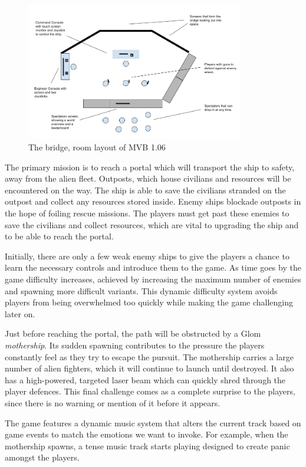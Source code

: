 \documentclass[a4paper,11pt]{article}
\begin{document}
\begin{figure}[ht]
	\centering
    \includegraphics[width=0.85\textwidth]{Room}
    \caption{The bridge, room layout of MVB 1.06}
    \label{fig:room_layout}
\end{figure}

The primary mission is to reach a portal which will transport the ship to safety, away from the alien fleet. Outposts, which house civilians and resources will be encountered on the way. The ship is able to save the civilians stranded on the outpost and collect any resources stored inside. Enemy ships blockade outposts in the hope of foiling rescue missions. The players must get past these enemies to save the civilians and collect resources, which are vital to upgrading the ship and to be able to reach the portal.

Initially, there are only a few weak enemy ships to give the players a chance to learn the necessary controls and introduce them to the game. As time goes by the game difficulty increases, achieved by increasing the maximum number of enemies and spawning more difficult variants. This dynamic difficulty system avoids players from being overwhelmed too quickly while making the game challenging later on.

Just before reaching the portal, the path will be obstructed by a Glom \emph{mothership}. Its sudden spawning contributes to the pressure the players constantly feel as they try to escape the pursuit. The mothership carries a large number of alien fighters, which it will continue to launch until destroyed. It also has a high-powered, targeted laser beam which can quickly shred through the player defences. This final challenge comes as a complete surprise to the players, since there is no warning or mention of it before it appears.

The game features a dynamic music system that alters the current track based on game events to match the emotions we want to invoke. For example, when the mothership spawns, a tense music track starts playing designed to create panic amongst the players.
\end{document}
